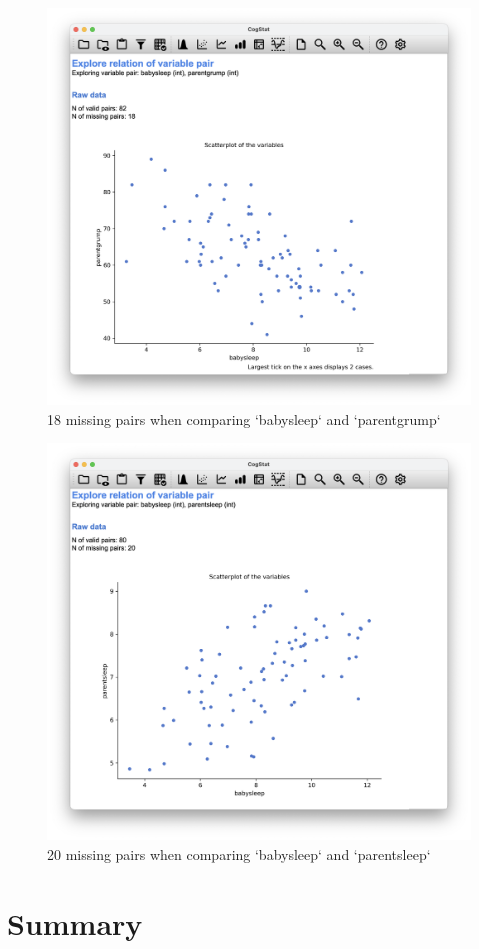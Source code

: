 \documentclass[
  11pt,
  a4paper,
  twoside,symmetric,openright]{book}
\theoremstyle{break}
\theoremstyle{break}
\begin{document}
\begin{figure}

{\centering \includegraphics[width=0.6\linewidth]{resources/image/cogstatbabysleepparentgrumpmissing} 

}

\caption{18 missing pairs when comparing `babysleep` and `parentgrump`}\label{fig:parenthoodmissingcog2}
\end{figure}

\begin{figure}

{\centering \includegraphics[width=0.6\linewidth]{resources/image/cogstatparentsleepbabysleepmissing} 

}

\caption{20 missing pairs when comparing `babysleep` and `parentsleep`}\label{fig:parenthoodmissingcog3}
\end{figure}

\section*{Summary}\label{summary-2}
\end{document}
